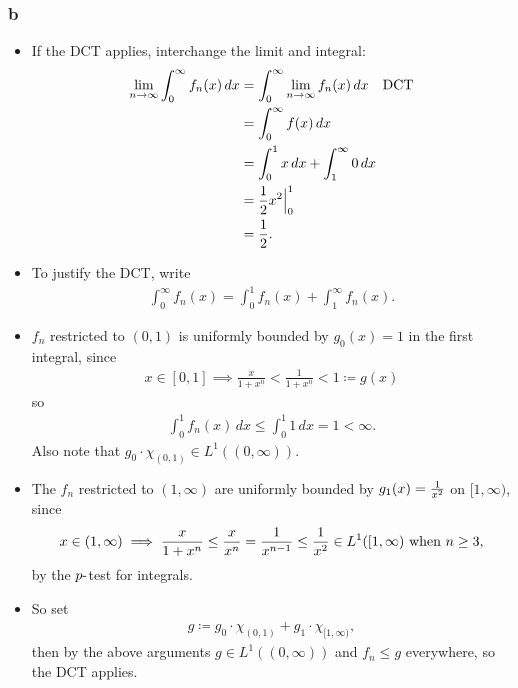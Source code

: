 \begin{solution}
\hypertarget{b}{%
\subsubsection{b}\label{b}}

\begin{itemize}
\item
  If the DCT applies, interchange the limit and integral:
  \begin{align*}
    \lim_{n\to\infty }\int_0^\infty f_n(x)\, dx 
  &= \int_0^\infty \lim_{n\to\infty}f_n(x) \, dx \quad\text{DCT}\\
    &=\int_0^\infty f(x) \,dx \\
    &= \int_0^1 x \,dx + \int_1^\infty 0\, dx \\
    &= {1\over 2}x^2 \Big|_0^1 \\
    &= {1\over 2}
    .\end{align*}
\item
  To justify the DCT, write
  \begin{align*}
  \int_0^\infty f_n(x)
  = \int_0^1 f_n(x) + \int_1^\infty f_n(x)
  .\end{align*}
\item
  \(f_n\) restricted to \((0, 1)\) is uniformly bounded by
  \(g_0(x) = 1\) in the first integral, since
  \begin{align*}
  x \in [0, 1] \implies \frac{x}{1+x^n} < \frac{1}{1+x^n} < 1 \coloneqq g(x)
  \end{align*}
  so
  \begin{align*}
  \int_0^1 f_n(x)\,dx \leq \int_0^1 1 \,dx = 1 < \infty
  .\end{align*}
  Also note that \(g_0\cdot \chi_{(0, 1)} \in L^1((0, \infty))\).
\item
  The \(f_n\) restricted to \((1, \infty)\) are uniformly bounded by
  \(g_1(x) = {1\over x^{2}}\) on \([1, \infty)\), since
  \begin{align*}
  x \in (1, \infty) \implies \frac{x}{1+x^n} \leq {x \over x^n} = {1 \over x^{n-1}} \leq {1\over x^2}\in L^1([1, \infty) \text{ when } n\geq 3
  ,\end{align*}
  by the \(p{\hbox{-}}\)test for integrals.
\item
  So set
  \begin{align*}g \coloneqq g_0 \cdot \chi_{(0, 1)} + g_1 \cdot \chi_{[1, \infty)},\end{align*}
  then by the above arguments \(g \in L^1((0, \infty))\) and
  \(f_n \leq g\) everywhere, so the DCT applies.
\end{itemize}

\end{solution}

